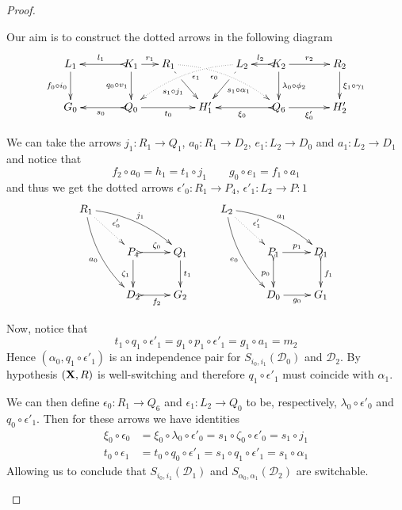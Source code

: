 \documentclass[a4paper,UKenglish,cleveref,pdftex,thm-restate,numberwithinsect]{lipics-v2021}
\def\R{\mathsf{R}}
\def\X{\textbf {\textup{X}}}
\def\G{\textbf {\textup{G}}}
\newcommand{\dder}[1]{\mathscr{#1}}
\begin{document}
\begin{proof}
\begin{enumerate}
		Our aim is to construct the dotted arrows in the following diagram
		\[\xymatrix@C=15pt{L_1 \ar[d]_{f_0\circ i_0}&& K_1
			\ar[d]_{q_0\circ v_1}\ar@{>->}[ll]_{l_1} \ar[r]^{r_1} & R_1
			\ar@{.>}@/^.35cm/[drrr]_(.4){\epsilon_0}|(.29)\hole
			\ar[dr]|(.28)\hole_{s_1\circ j_1} && L_2
			\ar@{.>}@/_.35cm/[dlll]^(.4){\epsilon_1}
			\ar[dl]|(.28)\hole^{s_1\circ \alpha_1}& K_2
			\ar[d]^{\lambda_0\circ \phi_2}\ar@{>->}[l]_{l_2} \ar[rr]^{r_2} &&
			R_2 \ar[d]^{\xi_1\circ \gamma_1}\\G_0 && \ar@{>->}[ll]^{s_0} Q_0
			\ar[rr]_{t_0}&& H'_1 && \ar@{>->}[ll]^{\xi_0} Q_6
			\ar[rr]_{\xi'_0}&& H'_2}\]
		
		We can take the arrows $j_1\colon R_1\to Q_1$, 
		$a_0\colon R_1\to D_2$, $e_1\colon L_2 \to D_0$ and $a_1\colon L_2\to D_1$ and notice that
		\[	f_2\circ a_0 =h_1 =t_1\circ j_1 \qquad   g_0\circ e_1=f_1\circ a_1\]
		and thus we get the dotted arrows $\epsilon'_0\colon R_1\to P_4$, $\epsilon'_1\colon L_2\to P:1$ 
		\[\xymatrix{R_1 \ar@{.>}[dr]^{\epsilon'_0} 
			\ar@/^.3cm/[drr]^{j_1} \ar@/_.3cm/[ddr]_{a_0}&&& L_2 \ar@{.>}[dr]^{\epsilon'_1}
			\ar@/^.3cm/[drr]^{a_1} \ar@/_.3cm/[ddr]_{e_0}\\ &P_4
			\ar@{>->}[r]^{\zeta_0} \ar[d]_{\zeta_1}& Q_1 \ar[d]^{t_1} &&P_1
			\ar[r]^{p_1} \ar@{>->}[d]_{p_0}& D_1 \ar@{>->}[d]^{f_1}\\
			&D_2\ar@{>->}[r]_{f_2} & G_2& 	&D_0\ar[r]_{g_0} & G_1} \]
		
		Now, notice that
		\[
		t_1\circ q_1\circ \epsilon'_1  =g_1\circ p_1\circ \epsilon'_1  =g_1\circ a_1 =m_2
		\]
		Hence $(\alpha_0, q_1\circ \epsilon'_1)$ is an independence pair
		for $S_{i_0, i_1}(\dder{D}_0)$ and $\dder{D}_2$. By hypothesis $(\X, \R)$ is well-switching and therefore
		$q_1\circ \epsilon'_1$ must coincide with $\alpha_1$.	
		
		
		We can then define $\epsilon_0\colon R_1\to Q_6$ and $\epsilon_1\colon L_2\to Q_0$ to be, respectively, 
		$\lambda_0\circ \epsilon'_0$ and $q_0\circ
		\epsilon'_1$. Then for these  arrows we have  identities
		\begin{align*}
			\xi_0\circ \epsilon_0 & =\xi_0\circ \lambda_0\circ \epsilon'_0 =s_1\circ \zeta_0 \circ \epsilon'_0=s_1\circ j_1\\	t_0\circ \epsilon_1 & = t_0\circ q_0\circ \epsilon'_1 =s_1\circ q_1\circ \epsilon'_1=s_1\circ \alpha_1
		\end{align*}
		Allowing us to conclude that
		$S_{i_0,i_1}(\dder{D}_1)$ and $S_{\alpha_0,
			\alpha_1}(\dder{D}_2)$ are switchable.  \qedhere
	\end{enumerate}
\end{proof}
\end{document}
